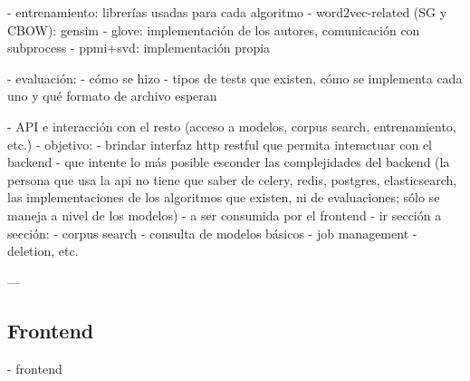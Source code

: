 - entrenamiento: librerías usadas para cada algoritmo
    - word2vec-related (SG y CBOW): gensim
    - glove: implementación de los autores, comunicación con subprocess
    - ppmi+svd: implementación propia

- evaluación:
    - cómo se hizo
    - tipos de tests que existen, cómo se implementa cada uno y qué formato de archivo esperan

- API e interacción con el resto (acceso a modelos, corpus search, entrenamiento, etc.)
    - objetivo:
        - brindar interfaz http restful que permita interactuar con el backend
        - que intente lo más posible esconder las complejidades del backend
          (la persona que usa la api no tiene que saber de celery, redis, postgres, elasticsearch,
           las implementaciones de los algoritmos que existen, ni de evaluaciones; sólo se maneja
           a nivel de los modelos)
        - a ser consumida por el frontend
    - ir sección a sección:
        - corpus search
        - consulta de modelos básicos
        - job management
        - deletion, etc.

---


\subsection{Frontend}

- frontend